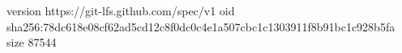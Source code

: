 version https://git-lfs.github.com/spec/v1
oid sha256:78dc618e08cf62ad5cd12c8f0dc0c4e1a507cbc1c1303911f8b91bc1c928b5fa
size 87544
